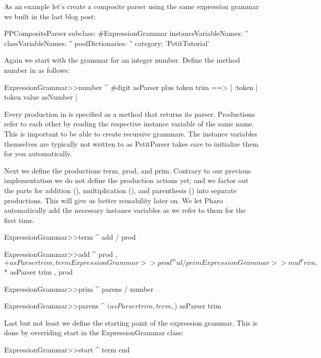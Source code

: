\documentclass[a4paper,10pt,twoside]{book}
\begin{document}
As an example let's create a composite parser using the same
expression grammar we built in the last blog post:

\begin{code}{}
PPCompositeParser subclass: #ExpressionGrammar
   instanceVariableNames: ''
   classVariableNames: ''
   poolDictionaries: ''
   category: 'PetitTutorial'
\end{code}

Again we start with the grammar for an integer number. Define the
method number in  as follows:

\begin{code}{}
ExpressionGrammar>>number
   ^ #digit asParser plus token trim ==> [ :token | token value asNumber ]
\end{code}

Every production in  is specified as a method
that returns its parser. Productions refer to each other by reading
the respective instance variable of the same name. This is important
to be able to create recursive grammars. The instance variables
themselves are typically not written to as PetitParser takes care to
initialize them for you automatically.

Next we define the productions term, prod, and prim. Contrary to our
previous implementation we do not define the production actions yet;
and we factor out the parts for addition (), multiplication
(), and parenthesis () into separate productions.
This will give us better reusability later on. We let Pharo
automatically add the necessary instance variables as we refer to them
for the first time.

\begin{code}{}
ExpressionGrammar>>term
   ^ add / prod

ExpressionGrammar>>add
   ^ prod , $+ asParser trim , term

ExpressionGrammar>>prod
   ^ mul / prim

ExpressionGrammar>>mul
   ^ prim , $* asParser trim , prod

ExpressionGrammar>>prim
   ^ parens / number

ExpressionGrammar>>parens
   ^ $( asParser trim , term , $) asParser trim

Last but not least we define the starting point of the expression grammar. This is done by overriding start in the ExpressionGrammar class:

ExpressionGrammar>>start
   ^ term end
\end{code}
\end{document}
